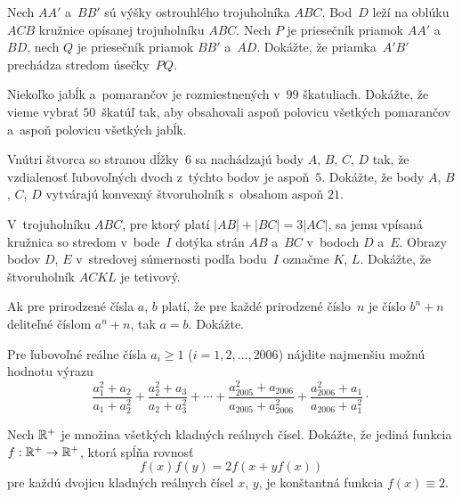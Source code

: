 {%
Nech $AA'$ a~$BB'$ sú výšky ostrouhlého trojuholníka $ABC$. Bod~$D$ leží na oblúku $ACB$ kružnice opísanej trojuholníku $ABC$.
Nech $P$ je priesečník priamok $AA'$ a~$BD$, nech $Q$ je priesečník priamok $BB'$ a~$AD$. Dokážte, že priamka~$A'B'$ prechádza stredom úsečky~$PQ$.}

{%
Niekoľko jabĺk a~pomarančov je rozmiestnených v~$99$ škatuliach. Dokážte, že vieme vybrať $50$~škatúľ tak, aby obsahovali aspoň polovicu všetkých pomarančov a~aspoň polovicu všetkých jabĺk.}

{%
Vnútri štvorca so stranou dĺžky~$6$ sa nachádzajú body $A$, $B$, $C$, $D$ tak, že vzdialenosť ľubovoľných dvoch z~týchto bodov je aspoň~$5$.
Dokážte, že body $A$, $B$, $C$, $D$ vytvárajú konvexný štvoruholník s~obsahom aspoň $21$.}

{%
V~trojuholníku $ABC$, pre ktorý platí $|AB|+|BC|=3|AC|$, sa jemu vpísaná kružnica so stredom v~bode~$I$ dotýka strán $AB$ a~$BC$ v~bodoch $D$ a~$E$. Obrazy bodov $D$, $E$ v~stredovej súmernosti podľa bodu~$I$ označme $K$, $L$. Dokážte, že štvoruholník $ACKL$ je tetivový.
}

{%
Ak pre prirodzené čísla $a$, $b$ platí, že pre každé prirodzené číslo~$n$ je číslo $b^n+n$ deliteľné číslom $a^n+n$, tak $a=b$. Dokážte.
}

{%
Pre ľubovoľné reálne čísla $a_i\ge 1$ ($i=1,2,\dots,2006$) nájdite najmenšiu možnú hodnotu výrazu
$$
\frac{a_1^2+a_2}{a_1+a_2^2}+\frac{a_2^2+a_3}{a_2+a_3^2}+\cdots+
\frac{a_{2005}^2+a_{2006}}{a_{2005}+a_{2006}^2}+\frac{a_{2006}^2+a_1}{a_{2006}+a_1^2}\cdot
$$}

{%
Nech $\Bbb R^+$ je množina všetkých kladných reálnych čísel. Dokážte, že jediná funkcia $f:\Bbb R^+\to\Bbb R^+$, ktorá spĺňa rovnosť
$$
f(x)f(y) = 2f(x+yf(x))
$$
pre každú dvojicu kladných reálnych čísel $x$, $y$, je konštantná funkcia $f(x)\equiv2$.
}

